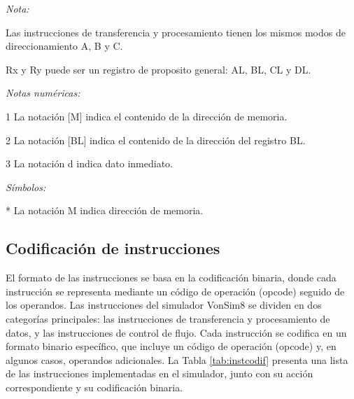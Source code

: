 \documentclass[12pt,oneside]{templates/unerthesis}
\begin{document}
\begin{table}[!h]
{\begin{threeparttable}
\begin{tabular}[t]{>{\raggedright\arraybackslash}p{4cm}|>{\raggedright\arraybackslash}p{5cm}>{\raggedright\arraybackslash}p{8cm}}
\bottomrule
\end{tabular}
\begin{tablenotes}
\item \textit{Nota: } 
\item Las instrucciones de transferencia y procesamiento tienen los mismos modos de direccionamiento A, B y C.
\item Rx y Ry puede ser un registro de proposito general: AL, BL, CL y DL.
\item \textit{Notas numéricas: } 
\item[1] La notación [M] indica el contenido de la dirección de memoria.
\item[2] La notación [BL] indica el contenido de la dirección del registro BL.
\item[3] La notación d indica dato inmediato.
\item \textit{Símbolos: } 
\item[*] La notación M indica dirección de memoria.
\end{tablenotes}
\end{threeparttable}}
\end{table}

\hypertarget{codificaciuxf3n-de-instrucciones}{%
\subsection{Codificación de instrucciones}\label{codificaciuxf3n-de-instrucciones}}

El formato de las instrucciones se basa en la codificación binaria, donde cada instrucción se representa mediante un código de operación (opcode) seguido de los operandos. Las instrucciones del simulador VonSim8 se dividen en dos categorías principales: las instrucciones de transferencia y procesamiento de datos, y las instrucciones de control de flujo. Cada instrucción se codifica en un formato binario específico, que incluye un código de operación (opcode) y, en algunos casos, operandos adicionales. La Tabla \ref{tab:instcodif} presenta una lista de las instrucciones implementadas en el simulador, junto con su acción correspondiente y su codificación binaria.
\end{document}
